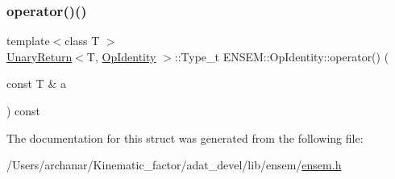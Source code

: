 \mbox{\label{structENSEM_1_1OpIdentity_a4ff09949750390fcf0e8f6a85b20a1ec}} 
\subsubsection{\texorpdfstring{operator()()}{operator()()}\hspace{0.1cm}{\footnotesize\ttfamily [2/2]}}
{\footnotesize\ttfamily template$<$class T $>$ \\
\mbox{\hyperlink{structENSEM_1_1UnaryReturn}{Unary\+Return}}$<$T, \mbox{\hyperlink{structENSEM_1_1OpIdentity}{Op\+Identity}} $>$\+::Type\+\_\+t E\+N\+S\+E\+M\+::\+Op\+Identity\+::operator() (\begin{DoxyParamCaption}\item[{const T \&}]{a }\end{DoxyParamCaption}) const\hspace{0.3cm}{\ttfamily [inline]}}



The documentation for this struct was generated from the following file\+:\begin{DoxyCompactItemize}
\item 
/\+Users/archanar/\+Kinematic\+\_\+factor/adat\+\_\+devel/lib/ensem/\mbox{\hyperlink{lib_2ensem_2ensem_8h}{ensem.\+h}}\end{DoxyCompactItemize}
